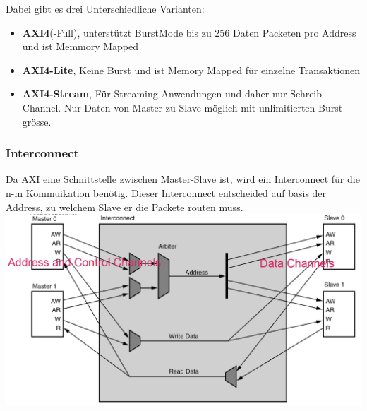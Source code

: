 Dabei gibt es drei Unterschiedliche Varianten:
\begin{itemize}
	\item \textbf{AXI4}(-Full), unterstützt BurstMode bis zu 256 Daten Packeten pro Address und ist Memmory Mapped
	\item \textbf{AXI4-Lite}, Keine Burst und ist Memory Mapped für einzelne Transaktionen
	\item \textbf{AXI4-Stream}, Für Streaming Anwendungen und daher nur Schreib-Channel. Nur Daten von Master zu Slave möglich mit unlimitierten Burst grösse.
\end{itemize}

\subsubsection{Interconnect}
Da AXI eine Schnittstelle zwischen Master-Slave ist, wird ein Interconnect für die n-m Kommuikation benötig. Dieser Interconnect entscheided auf basis der Address, zu welchem Slave er die Packete routen muss.
\includegraphics[width=\columnwidth]{Images/interconnect}
